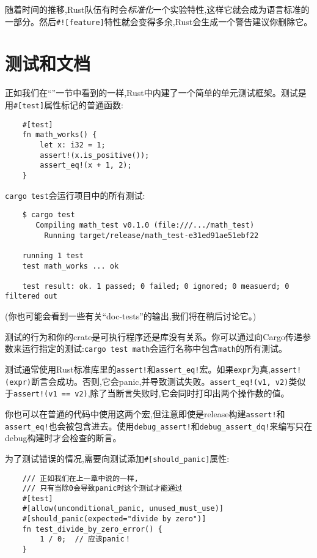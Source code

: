 随着时间的推移,Rust队伍有时会\emph{标准化}一个实验特性,这样它就会成为语言标准的一部分。然后\texttt{\#![feature]}特性就会变得多余,Rust会生成一个警告建议你删除它。

\section{测试和文档}

正如我们在“”一节中看到的一样,Rust中内建了一个简单的单元测试框架。测试是用\texttt{\#[test]}属性标记的普通函数:
\begin{verbatim}
    #[test]
    fn math_works() {
        let x: i32 = 1;
        assert!(x.is_positive());
        assert_eq!(x + 1, 2);
    }
\end{verbatim}

\texttt{cargo test}会运行项目中的所有测试:
\begin{verbatim}
    $ cargo test
       Compiling math_test v0.1.0 (file:///.../math_test)
         Running target/release/math_test-e31ed91ae51ebf22
    
    running 1 test
    test math_works ... ok

    test result: ok. 1 passed; 0 failed; 0 ignored; 0 measuerd; 0 filtered out
\end{verbatim}
(你也可能会看到一些有关“doc-tests”的输出,我们将在稍后讨论它。)

测试的行为和你的crate是可执行程序还是库没有关系。你可以通过向Cargo传递参数来运行指定的测试:\texttt{cargo test math}会运行名称中包含\texttt{math}的所有测试。

测试通常使用Rust标准库里的\texttt{assert!}和\texttt{assert\_eq!}宏。如果\texttt{expr}为真,\texttt{assert!(expr)}断言会成功。否则,它会panic,并导致测试失败。\texttt{assert\_eq!(v1, v2)}类似于\texttt{assert!(v1 == v2)},除了当断言失败时,它会同时打印出两个操作数的值。

你也可以在普通的代码中使用这两个宏,但注意即使是release构建\texttt{assert!}和\texttt{assert\_eq!}也会被包含进去。使用\texttt{debug\_assert!}和\texttt{debug\_assert\_dq!}来编写只在debug构建时才会检查的断言。

为了测试错误的情况,需要向测试添加\texttt{\#[should\_panic]}属性:
\begin{verbatim}
    /// 正如我们在上一章中说的一样,
    /// 只有当除0会导致panic时这个测试才能通过
    #[test]
    #[allow(unconditional_panic, unused_must_use)]
    #[should_panic(expected="divide by zero")]
    fn test_divide_by_zero_error() {
        1 / 0;  // 应该panic！
    }
\end{verbatim}

